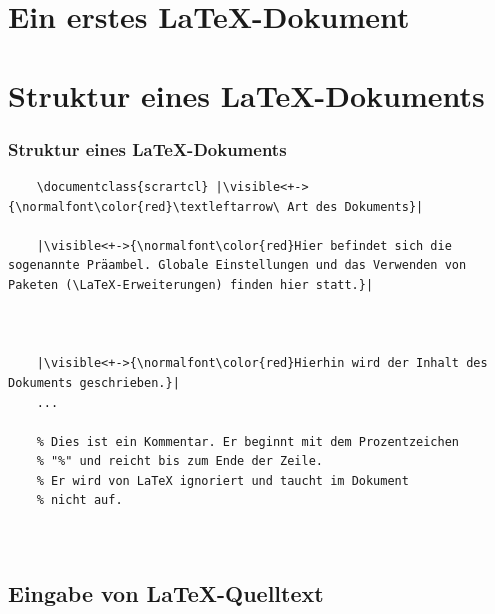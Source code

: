 \section{Ein erstes \LaTeX-Dokument}
\section{Struktur eines \LaTeX-Dokuments}

\begin{frame}[fragile]
	\frametitle{Struktur eines \LaTeX-Dokuments}
	\lstset{frame=L, numbers=left, xleftmargin=0.5cm}
	\only<+->{}
	\begin{lstlisting}
	\documentclass{scrartcl} |\visible<+->{\normalfont\color{red}\textleftarrow\ Art des Dokuments}|
	
	|\visible<+->{\normalfont\color{red}Hier befindet sich die sogenannte Präambel. Globale Einstellungen und das Verwenden von Paketen (\LaTeX-Erweiterungen) finden hier statt.}|
	
	
	
	|\visible<+->{\normalfont\color{red}Hierhin wird der Inhalt des Dokuments geschrieben.}|
	...
	
	% Dies ist ein Kommentar. Er beginnt mit dem Prozentzeichen
	% "%" und reicht bis zum Ende der Zeile.
	% Er wird von LaTeX ignoriert und taucht im Dokument
	% nicht auf.
	
	
	\end{lstlisting}
\end{frame}

\subsection{Eingabe von \LaTeX-Quelltext}

